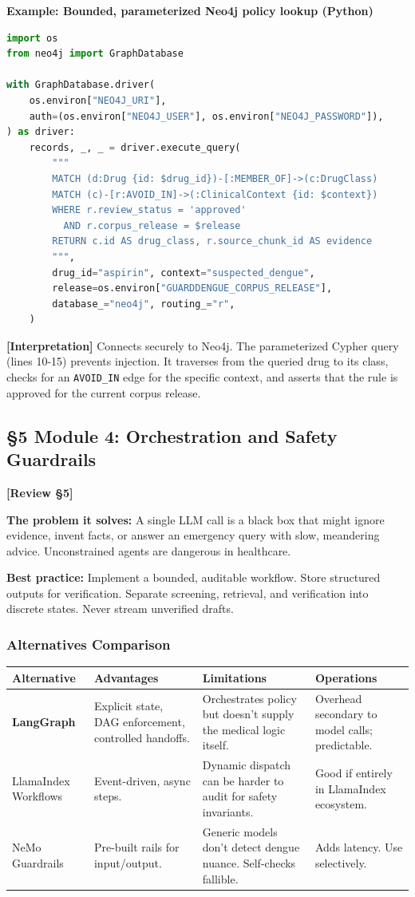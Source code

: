 \documentclass[11pt,a4paper]{article}
\newcommand{\origintag}[2]{\textcolor{#1}{\small\textbf{[#2]}}}
\begin{document}
\textbf{Example: Bounded, parameterized Neo4j policy lookup (Python)}
\begin{lstlisting}[language=Python]
import os
from neo4j import GraphDatabase

with GraphDatabase.driver(
    os.environ["NEO4J_URI"],
    auth=(os.environ["NEO4J_USER"], os.environ["NEO4J_PASSWORD"]),
) as driver:
    records, _, _ = driver.execute_query(
        """
        MATCH (d:Drug {id: $drug_id})-[:MEMBER_OF]->(c:DrugClass)
        MATCH (c)-[r:AVOID_IN]->(:ClinicalContext {id: $context})
        WHERE r.review_status = 'approved'
          AND r.corpus_release = $release
        RETURN c.id AS drug_class, r.source_chunk_id AS evidence
        """,
        drug_id="aspirin", context="suspected_dengue",
        release=os.environ["GUARDDENGUE_CORPUS_RELEASE"],
        database_="neo4j", routing_="r",
    )
\end{lstlisting}
\origintag{slate}{Interpretation} Connects securely to Neo4j. The parameterized Cypher query (lines 10-15) prevents injection. It traverses from the queried drug to its class, checks for an \texttt{AVOID\_IN} edge for the specific context, and asserts that the rule is approved for the current corpus release.
\subsection{\S5 Module 4: Orchestration and Safety Guardrails}
\origintag{amber}{Review \S5}

\textbf{The problem it solves:} A single LLM call is a black box that might ignore evidence, invent facts, or answer an emergency query with slow, meandering advice. Unconstrained agents are dangerous in healthcare.

\textbf{Best practice:} Implement a bounded, auditable workflow. Store structured outputs for verification. Separate screening, retrieval, and verification into discrete states. Never stream unverified drafts.

\subsubsection{Alternatives Comparison}
\begin{table}[ht]
\centering
\begin{tabularx}{\textwidth}{lXXX}
\toprule
\textbf{Alternative} & \textbf{Advantages} & \textbf{Limitations} & \textbf{Operations} \\
\midrule
\textbf{LangGraph} & Explicit state, DAG enforcement, controlled handoffs. & Orchestrates policy but doesn't supply the medical logic itself. & Overhead secondary to model calls; predictable. \\
LlamaIndex Workflows & Event-driven, async steps. & Dynamic dispatch can be harder to audit for safety invariants. & Good if entirely in LlamaIndex ecosystem. \\
NeMo Guardrails & Pre-built rails for input/output. & Generic models don't detect dengue nuance. Self-checks fallible. & Adds latency. Use selectively. \\
\bottomrule
\end{tabularx}
\end{table}
\end{document}
